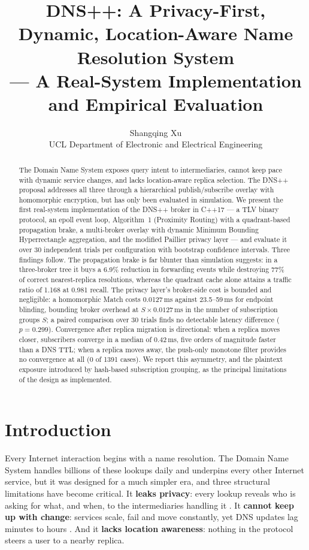 \documentclass[10pt]{article}
\title{\large DNS++: A Privacy-First, Dynamic, Location-Aware Name Resolution System\\
\large --- A Real-System Implementation and Empirical Evaluation}
\author{\name Shangqing Xu \\
      \addr UCL Department of Electronic and Electrical Engineering}
\begin{document}
\maketitle

\begin{abstract}
The Domain Name System exposes query intent to intermediaries, cannot keep pace with dynamic service changes, and lacks location-aware replica selection. The DNS++ proposal addresses all three through a hierarchical publish/subscribe overlay with homomorphic encryption, but has only been evaluated in simulation. We present the first real-system implementation of the DNS++ broker in C++17 --- a TLV binary protocol, an epoll event loop, Algorithm~1 (Proximity Routing) with a quadrant-based propagation brake, a multi-broker overlay with dynamic Minimum Bounding Hyperrectangle aggregation, and the modified Paillier privacy layer --- and evaluate it over 30 independent trials per configuration with bootstrap confidence intervals. Three findings follow. The propagation brake is far blunter than simulation suggests: in a three-broker tree it buys a 6.9\% reduction in forwarding events while destroying 77\% of correct nearest-replica resolutions, whereas the quadrant cache alone attains a traffic ratio of 1.168 at 0.981 recall. The privacy layer's broker-side cost is bounded and negligible: a homomorphic Match costs 0.0127\,ms against 23.5--59\,ms for endpoint blinding, bounding broker overhead at $S \times 0.0127$\,ms in the number of subscription groups $S$; a paired comparison over 30 trials finds no detectable latency difference ($p = 0.299$). Convergence after replica migration is directional: when a replica moves closer, subscribers converge in a median of 0.42\,ms, five orders of magnitude faster than a DNS TTL; when a replica moves away, the push-only monotone filter provides no convergence at all (0 of 1391 cases). We report this asymmetry, and the plaintext exposure introduced by hash-based subscription grouping, as the principal limitations of the design as implemented.
\end{abstract}

\section{Introduction}
\label{sec:intro}

Every Internet interaction begins with a name resolution. The Domain Name System handles billions of these lookups daily and underpins every other Internet service, but it was designed for a much simpler era, and three structural limitations have become critical. It \textbf{leaks privacy}: every lookup reveals who is asking for what, and when, to the intermediaries handling it \citep{wicinski2021dns}. It \textbf{cannot keep up with change}: services scale, fail and move constantly, yet DNS updates lag minutes to hours \citep{mockapetris1987domain}. And it \textbf{lacks location awareness}: nothing in the protocol steers a user to a nearby replica.
\end{document}
